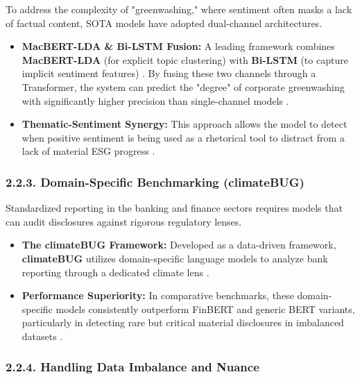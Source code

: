 \documentclass{article}
\begin{document}
To address the complexity of "greenwashing," where sentiment often masks a lack of factual content, SOTA models have adopted dual-channel architectures.
\begin{itemize}
\item 

\textbf{MacBERT-LDA \& Bi-LSTM Fusion:} A leading framework combines \textbf{MacBERT-LDA} (for explicit topic clustering) with \textbf{Bi-LSTM} (to capture implicit sentiment features)  \parencite{xiaojia_wang_02351a60}. By fusing these two channels through a Transformer, the system can predict the "degree" of corporate greenwashing with significantly higher precision than single-channel models  \parencite{xiaojia_wang_02351a60}.\item 

\textbf{Thematic-Sentiment Synergy:} This approach allows the model to detect when positive sentiment is being used as a rhetorical tool to distract from a lack of material ESG progress  \parencite{xiaojia_wang_02351a60}.
\end{itemize}
\subsubsection*{2.2.3. Domain-Specific Benchmarking (climateBUG)}

Standardized reporting in the banking and finance sectors requires models that can audit disclosures against rigorous regulatory lenses.
\begin{itemize}
\item 

\textbf{The climateBUG Framework:} Developed as a data-driven framework, \textbf{climateBUG} utilizes domain-specific language models to analyze bank reporting through a dedicated climate lens  \parencite{yinan_yu_e282fd98}.\item 

\textbf{Performance Superiority:} In comparative benchmarks, these domain-specific models consistently outperform FinBERT and generic BERT variants, particularly in detecting rare but critical material disclosures in imbalanced datasets  \parencite{yinan_yu_e282fd98}.
\end{itemize}
\subsubsection*{2.2.4. Handling Data Imbalance and Nuance}
\end{document}
